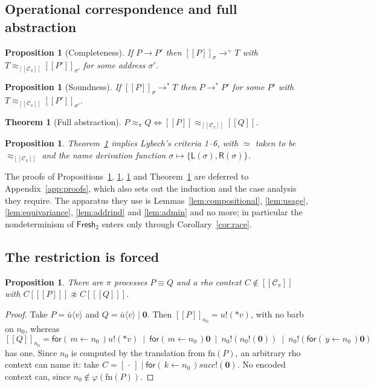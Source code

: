 \documentclass[11pt]{article}
\theoremstyle{definition}
\theoremstyle{plain}
\newtheorem{proposition}[definition]{Proposition}
\newtheorem{theorem}[definition]{Theorem}
\theoremstyle{remark}
\newcommand{\drp}[1]{{*}#1}
\newcommand{\inp}[3]{\mathsf{for}(\,#1 \leftarrow #2\,)#3}
\newcommand{\out}[2]{#1!(#2)}
\newcommand{\enc}[1]{[\![#1]\!]}
\newcommand{\nil}{\mathbf{0}}
\newcommand{\Lft}{\mathsf{L}}
\newcommand{\Rgt}{\mathsf{R}}
\newcommand{\Frsh}{\mathsf{Fresh}_2}
\newcommand{\Ctx}{\mathscr{C}}
\newcommand{\bisim}{\approx}
\newcommand{\fn}{\mathrm{fn}}
\begin{document}
\subsection{Operational correspondence and full abstraction}

\begin{proposition}[Completeness]\label{prop:complete}
If $P \to P'$ then $\enc{P}_\sigma \to^{+} T$ with
$T \bisim_{\enc{\Ctx_\pi}} \enc{P'}_{\sigma'}$ for some address
$\sigma'$.
\end{proposition}

\begin{proposition}[Soundness]\label{prop:sound}
If $\enc{P}_\sigma \to^* T$ then $P \to^* P'$ for some $P'$ with
$T \bisim_{\enc{\Ctx_\pi}} \enc{P'}_{\sigma'}$.
\end{proposition}

\begin{theorem}[Full abstraction]\label{thm:fullabs}
$P \bisim_\pi Q \iff \enc{P} \bisim_{\enc{\Ctx_\pi}} \enc{Q}$.
\end{theorem}

\begin{proposition}\label{prop:criteria}
Theorem~\ref{thm:fullabs} implies Lybech's criteria 1--6, with $\simeq$
taken to be $\bisim_{\enc{\Ctx_\pi}}$ and the name derivation function
$\sigma \mapsto \{\Lft(\sigma),\Rgt(\sigma)\}$.
\end{proposition}

The proofs of Propositions~\ref{prop:complete}, \ref{prop:sound},
\ref{prop:criteria} and Theorem~\ref{thm:fullabs} are deferred to
Appendix~\ref{app:proofs}, which also sets out the induction and the
case analysis they require. The apparatus they use is
Lemmas~\ref{lem:compositional}, \ref{lem:usage}, \ref{lem:equivariance},
\ref{lem:addrind} and \ref{lem:admin} and no more; in particular the
nondeterminism of $\Frsh$ enters only through
Corollary~\ref{cor:race}.

\subsection{The restriction is forced}\label{sec:necessity}

\begin{proposition}\label{prop:necessity}
There are $\pi$ processes $P \equiv Q$ and a rho context $C \notin
\enc{\Ctx_\pi}$ with $C[\enc{P}] \not\bisim C[\enc{Q}]$.
\end{proposition}

\begin{proof}
Take $P = \bar u\langle v\rangle$ and
$Q = \bar u\langle v\rangle \mid \nil$. Then
$\enc{P}_{n_0} = \out{u}{\drp{v}}$, with no barb on $n_0$, whereas
\[
\enc{Q}_{n_0} =
  \inp{m}{n_0}{\out{u}{\drp{v}}} \ \mid\ \inp{m}{n_0}{\nil}
  \ \mid\ \out{n_0}{\out{n_0}{\nil}} \ \mid\ \out{n_0}{\inp{y}{n_0}{\nil}}
\]
has one. Since $n_0$ is computed by the translation from $\fn(P)$, an
arbitrary rho context can name it: take
$C = [\,\cdot\,] \mid \inp{k}{n_0}{\out{\mathit{succ}}{\nil}}$. No
encoded context can, since $n_0 \notin \varphi(\fn(P))$.
\end{proof}
\end{document}
